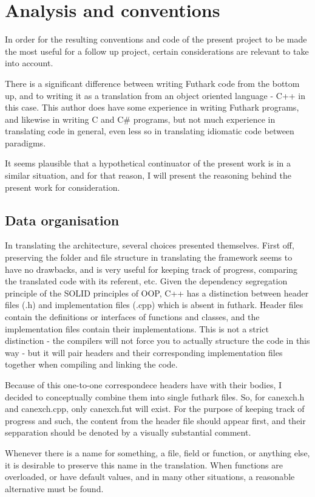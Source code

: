 \section{Analysis and conventions}
In order for the resulting conventions and code of the present project to be made the most useful for a follow up project, certain considerations are relevant to take into account.

There is a significant difference between writing Futhark code from the bottom up, and to writing it as a translation from an object oriented language - C++ in this case. This author does have some experience in writing Futhark programs, and likewise in writing C and C\# programs, but not much experience in translating code in general, even less so in translating idiomatic code between paradigms.

It seems plausible that a hypothetical continuator of the present work is in a similar situation, and for that reason, I will present the reasoning behind the present work for consideration.

\subsection{Data organisation}
In translating the architecture, several choices presented themselves. First off, preserving the folder and file structure in translating the framework seems to have no drawbacks, and is very useful for keeping track of progress, comparing the translated code with its referent, etc. Given the dependency segregation principle of the SOLID principles of OOP, C++ has a distinction between header files (.h) and implementation files (.cpp) which is absent in futhark. Header files contain the definitions or interfaces of functions and classes, and the implementation files contain their implementations. This is not a strict distinction - the compilers will not force you to actually structure the code in this way - but it will pair headers and their corresponding implementation files together when compiling and linking the code.

Because of this one-to-one correspondece headers have with their bodies, I decided to conceptually combine them into single futhark files. So, for canexch.h and canexch.cpp, only canexch.fut will exist. For the purpose of keeping track of progress and such, the content from the header file should appear first, and their sepparation should be denoted by a visually substantial comment.

Whenever there is a name for something, a file, field or function, or anything else, it is desirable to preserve this name in the translation. When functions are overloaded, or have default values, and in many other situations, a reasonable alternative must be found.

